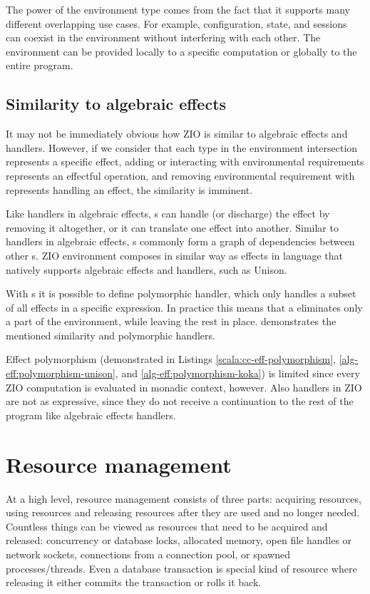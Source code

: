 

The power of the environment type comes from the fact that it supports many different overlapping use cases. For example, configuration, state, and sessions can coexist in the environment without interfering with each other. The environment can be provided locally to a specific computation or globally to the entire program.


\subsection{Similarity to algebraic effects}
It may not be immediately obvious how ZIO is similar to algebraic effects and handlers.
However, if we consider that each type in the environment intersection represents a specific effect, adding or interacting with environmental requirements represents an effectful operation, and removing environmental requirement with  represents handling an effect, the similarity is imminent. 

Like handlers in algebraic effects, s can handle (or discharge) the effect by removing it altogether, or it can translate one effect into another. Similar to handlers in algebraic effects, s commonly form a graph of dependencies between other s. ZIO environment composes in similar way as effects in language that natively supports algebraic effects and handlers, such as Unison.

With s it is possible to define polymorphic handler, which only handles a subset of all effects in a specific expression. In practice this means that a  eliminates only a part of the environment, while leaving the rest in place.  demonstrates the mentioned similarity and polymorphic handlers.



Effect polymorphism (demonstrated in Listings \ref{scala:cc-eff-polymorphism}, \ref{alg-eff:polymorphism-unison}, and \ref{alg-eff:polymorphism-koka}) is limited since every ZIO computation is evaluated in monadic context, however. Also handlers in ZIO are not as expressive, since they do not receive a continuation to the rest of the program like algebraic effects handlers.


\section{Resource management} \label{zio:resource-management}
At a high level, resource management consists of three parts: acquiring resources, using resources and releasing resources after they are used and no longer needed. Countless things can be viewed as resources that need to be acquired and released: concurrency or database locks, allocated memory, open file handles or network sockets, connections from a connection pool, or spawned processes/threads. Even a database transaction is special kind of resource where releasing it either commits the transaction or rolls it back.

